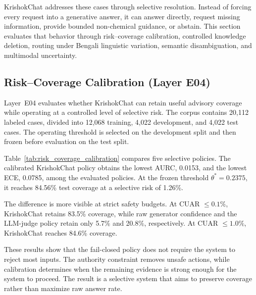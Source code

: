 \documentclass[a4paper,fleqn]{cas-dc}
\begin{document}
KrishokChat addresses these cases through selective resolution. Instead of forcing every request into a generative answer, it can answer directly, request missing information, provide bounded non-chemical guidance, or abstain. This section evaluates that behavior through risk--coverage calibration, controlled knowledge deletion, routing under Bengali linguistic variation, semantic disambiguation, and multimodal uncertainty.

\subsection{Risk--Coverage Calibration (Layer E04)}

Layer~E04 evaluates whether KrishokChat can retain useful advisory coverage while operating at a controlled level of selective risk. The corpus contains 20{,}112 labeled cases, divided into 12{,}068 training, 4{,}022 development, and 4{,}022 test cases. The operating threshold is selected on the development split and then frozen before evaluation on the test split.

Table~\ref{tab:risk_coverage_calibration} compares five selective policies. The calibrated KrishokChat policy obtains the lowest AURC, 0.0153, and the lowest ECE, 0.0785, among the evaluated policies. At the frozen threshold $\theta^*=0.2375$, it reaches 84.56\% test coverage at a selective risk of 1.26\%.

The difference is more visible at strict safety budgets. At CUAR $\leq 0.1\%$, KrishokChat retains 83.5\% coverage, while raw generator confidence and the LLM-judge policy retain only 5.7\% and 20.8\%, respectively. At CUAR $\leq 1.0\%$, KrishokChat reaches 84.6\% coverage.

These results show that the fail-closed policy does not require the system to reject most inputs. The authority constraint removes unsafe actions, while calibration determines when the remaining evidence is strong enough for the system to proceed. The result is a selective system that aims to preserve coverage rather than maximize raw answer rate.
\end{document}
